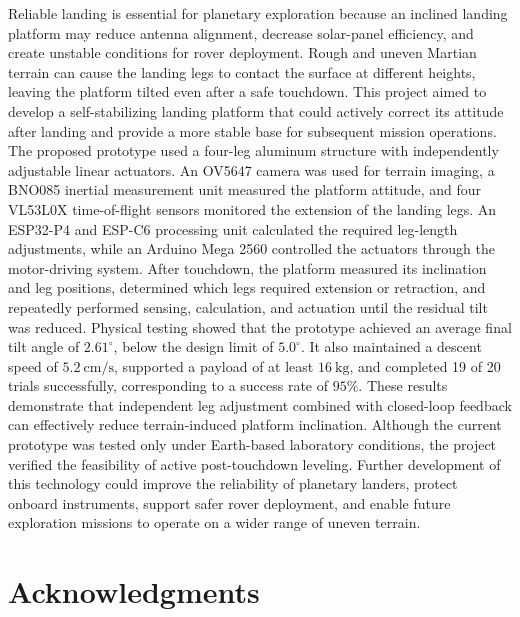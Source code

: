 \documentclass{engr1000j-s2}
\begin{document}
Reliable landing is essential for planetary exploration because an inclined landing platform may reduce antenna alignment, decrease solar-panel efficiency, and create unstable conditions for rover deployment. Rough and uneven Martian terrain can cause the landing legs to contact the surface at different heights, leaving the platform tilted even after a safe touchdown. This project aimed to develop a self-stabilizing landing platform that could actively correct its attitude after landing and provide a more stable base for subsequent mission operations. The proposed prototype used a four-leg aluminum structure with independently adjustable linear actuators. An OV5647 camera was used for terrain imaging, a BNO085 inertial measurement unit measured the platform attitude, and four VL53L0X time-of-flight sensors monitored the extension of the landing legs. An ESP32-P4 and ESP-C6 processing unit calculated the required leg-length adjustments, while an Arduino Mega 2560 controlled the actuators through the motor-driving system. After touchdown, the platform measured its inclination and leg positions, determined which legs required extension or retraction, and repeatedly performed sensing, calculation, and actuation until the residual tilt was reduced. Physical testing showed that the prototype achieved an average final tilt angle of \(2.61^\circ\), below the design limit of \(5.0^\circ\). It also maintained a descent speed of \(5.2~\mathrm{cm/s}\), supported a payload of at least \(16~\mathrm{kg}\), and completed 19 of 20 trials successfully, corresponding to a success rate of \(95\%\). These results demonstrate that independent leg adjustment combined with closed-loop feedback can effectively reduce terrain-induced platform inclination. Although the current prototype was tested only under Earth-based laboratory conditions, the project verified the feasibility of active post-touchdown leveling. Further development of this technology could improve the reliability of planetary landers, protect onboard instruments, support safer rover deployment, and enable future exploration missions to operate on a wider range of uneven terrain.





\hspace{1em}

\section{Acknowledgments}
\end{document}
